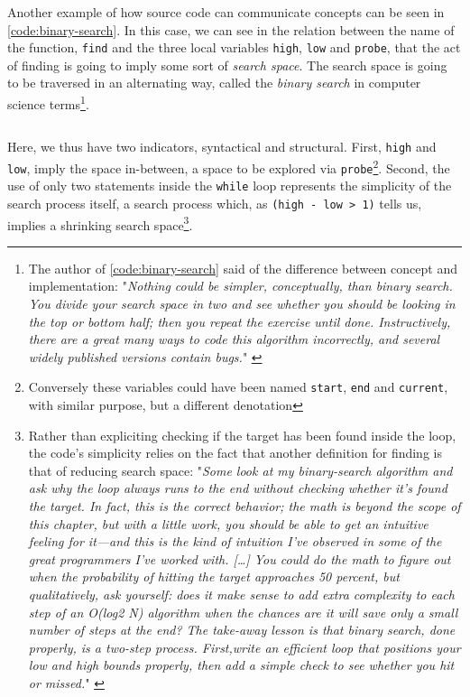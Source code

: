 Another example of how source code can communicate concepts can be seen in \autoref{code:binary-search}. In this case, we can see in the relation between the name of the function, \lstinline{find} and the three local variables \lstinline{high}, \lstinline{low} and \lstinline{probe}, that the act of finding is going to imply some sort of \emph{search space}. The search space is going to be traversed in an alternating way, called the \emph{binary search} in computer science terms\footnote{The author of \autoref{code:binary-search} said of the difference between concept and implementation: "\emph{Nothing could be simpler, conceptually, than binary search. You divide your search space in two and see whether you should be looking in the top or bottom half; then you repeat the exercise until done. Instructively, there are a great many ways to code this algorithm incorrectly, and several widely published versions contain bugs.}" \citep{bray_finding_2007}}.

\begin{listing}
    \inputminted[]{java}{./corpus/binary.java}
    \caption{\emph{binary.java} - Binary search, implemented by Tim Bray in \emph{Beautiful Code} highlights variable names (\lstinline{high}, \lstinline{low}, \lstinline{probe}) as indicators of the spatial component of the function's performance \citep{bray_finding_2007}.}
    \label{code:binary-search}
\end{listing}

Here, we thus have two indicators, syntactical and structural. First, \lstinline{high} and \lstinline{low}, imply the space in-between, a space to be explored via \lstinline{probe}\footnote{Conversely these variables could have been named \lstinline{start}, \lstinline{end} and \lstinline{current}, with similar purpose, but a different denotation}. Second, the use of only two statements inside the \lstinline{while} loop represents the simplicity of the search process itself, a search process which, as \lstinline{(high - low > 1)} tells us, implies a shrinking search space\footnote{Rather than expliciting checking if the target has been found inside the loop, the code's simplicity relies on the fact that another definition for finding is that of reducing search space: "\emph{Some look at my binary-search algorithm and ask why the loop always runs to the end without checking whether it's found the target. In fact, this is the correct behavior; the math is beyond the scope of this chapter, but with a little work, you should be able to get an intuitive feeling for it—and this is the kind of intuition I've observed in some of the great programmers I've worked with. [\dots] You could do the math to figure out when the probability of hitting the target approaches 50 percent, but qualitatively, ask yourself: does it make sense to add extra complexity to each step of an O(log2 N) algorithm when the chances are it will save only a small number of steps at the end?  The take-away lesson is that binary search, done properly, is a two-step process. First,write an efficient loop that positions your low and high bounds properly, then add a simple check to see whether you hit or missed.}" \citep{bray_finding_2007}}.

